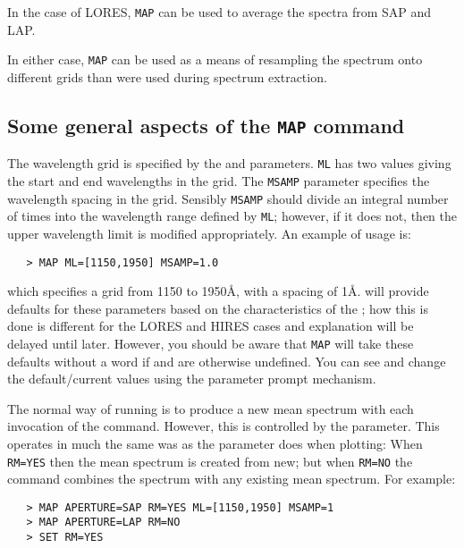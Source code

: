 In the case of LORES, \verb+MAP+ can be used to average the spectra from SAP and
LAP\@.

In either case, \verb+MAP+ can be used as a means of resampling the spectrum
onto different grids than were used during spectrum extraction.


\subsection{Some general aspects of the {\tt MAP} command}

The wavelength grid is specified by the 
 and 
 parameters.
\verb+ML+ has two values giving the start and end wavelengths in the grid.
The \verb+MSAMP+ parameter specifies the wavelength spacing in the grid.
Sensibly \verb+MSAMP+ should divide an integral number of times into the
wavelength range defined by \verb+ML+; however, if it does not, then the upper
wavelength limit is modified appropriately.  An example of usage is:

\begin{verbatim}
   > MAP ML=[1150,1950] MSAMP=1.0
\end{verbatim}

which specifies a grid from 1150 to 1950\AA , with a spacing of 1\AA\@.
 will provide defaults for these parameters based on the
characteristics of the ; how this is done
is different for the
LORES and HIRES cases and explanation will be delayed until later.  However, you
should be aware that \verb+MAP+ will take these defaults without a word if
 and 
 are otherwise undefined.  You can see and change
the default/current values using the parameter prompt mechanism.

The normal way of running 
 is to produce a new mean spectrum with each
invocation of the command.  However, this is controlled by the
 parameter.  This operates in much the same was as
the  parameter does
when plotting: When \verb+RM=YES+ then the mean spectrum is created from new;
but when \verb+RM=NO+ the command combines the spectrum with any existing mean
spectrum.  For example:

\begin{verbatim}
   > MAP APERTURE=SAP RM=YES ML=[1150,1950] MSAMP=1
   > MAP APERTURE=LAP RM=NO
   > SET RM=YES
\end{verbatim}

